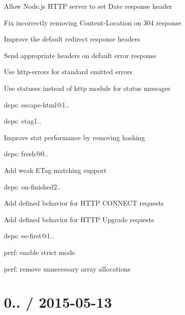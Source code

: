 \begin{DoxyItemize}
\item Allow Node.\+js H\+T\+TP server to set {\ttfamily Date} response header
\item Fix incorrectly removing {\ttfamily Content-\/\+Location} on 304 response
\item Improve the default redirect response headers
\item Send appropriate headers on default error response
\item Use {\ttfamily http-\/errors} for standard emitted errors
\item Use {\ttfamily statuses} instead of {\ttfamily http} module for status messages
\item deps\+: escape-\/html@1..
\item deps\+: etag1..
\begin{DoxyItemize}
\item Improve stat performance by removing hashing
\end{DoxyItemize}
\item deps\+: fresh@0..
\begin{DoxyItemize}
\item Add weak {\ttfamily E\+Tag} matching support
\end{DoxyItemize}
\item deps\+: on-\/finished2..
\begin{DoxyItemize}
\item Add defined behavior for H\+T\+TP {\ttfamily C\+O\+N\+N\+E\+CT} requests
\item Add defined behavior for H\+T\+TP {\ttfamily Upgrade} requests
\item deps\+: ee-\/first@1..
\end{DoxyItemize}
\item perf\+: enable strict mode
\item perf\+: remove unnecessary array allocations
\end{DoxyItemize}

\section*{0.. / 2015-\/05-\/13 }


